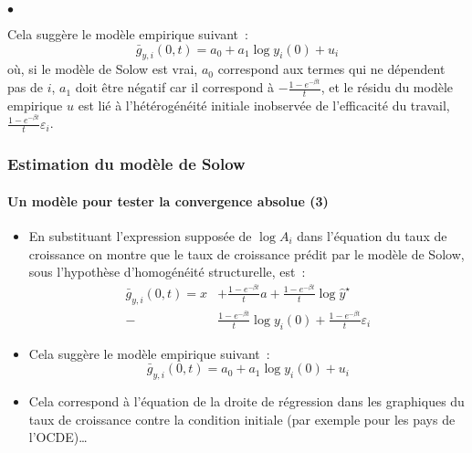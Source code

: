 \documentclass[10pt,notheorems]{beamer}
\theoremstyle{plain}
\theoremstyle{definition} %
\begin{document}
\begin{notes}
\begin{list}{$\bullet$}{}
  \item Cela suggère le modèle empirique suivant~:
    \[
      \bar g_{y,i}(0,t) = a_0 + a_1\log y_i(0) + u_i
    \]
    où, si le modèle de Solow est vrai, $a_0$ correspond aux termes qui ne dépendent pas de $i$, $a_1$ doit être négatif car il correspond à $-\frac{1-e^{-\beta t}}{t}$, et le résidu du modèle empirique $u$ est lié à l'hétérogénéité initiale inobservée de l'efficacité du travail, $\frac{1-e^{-\beta t}}{t}\varepsilon_i$.
  \end{list}

\end{notes}


\begin{frame}
  \frametitle{Estimation du modèle de Solow}
  \framesubtitle{Un modèle pour tester la convergence absolue (3)}

  \begin{itemize}

  \item En substituant l'expression supposée de $\log A_i$ dans l'équation du taux de croissance on montre que le taux de croissance prédit par le modèle de Solow, sous l'hypothèse d'homogénéité structurelle, est~:
    \[
      \begin{split}
        \bar g_{y,i}(0,t) = x& + \frac{1-e^{-\beta t}}{t} a + \frac{1-e^{-\beta t}}{t}\log \hat y^{\star}\\
        -& \frac{1-e^{-\beta t}}{t}\log y_i(0) + \frac{1-e^{-\beta t}}{t}\varepsilon_i
        \end{split}
    \]

  \item Cela suggère le modèle empirique suivant~:
    \[
      \bar g_{y,i}(0,t) = a_0 + a_1\log y_i(0) + u_i
    \]

  \item Cela correspond à l'équation de la droite de régression dans les graphiques du taux de croissance contre la condition initiale (par exemple pour les pays de l'OCDE)\ldots
  \end{itemize}

\end{frame}
\end{document}

